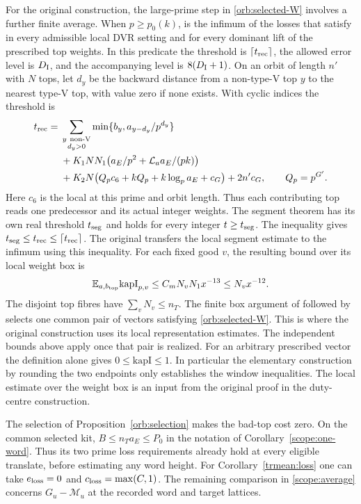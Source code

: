 For the original construction, the large-prime step in
\eqref{orb:selected-W} involves a further finite average.
When \(p\ge p_0(k)\),  is the infimum of the losses
that satisfy  in every admissible local DVR setting
and for every dominant lift of the prescribed top weights. In
this predicate the threshold is \(\lceil t_{\rm rec}\rceil\), the
allowed error level is \(D_{\rm I}\), and the accompanying level
is \(8(D_{\rm I}+1)\). On an orbit of length \(n'\) with \(N\) tops,
let \(d_y\) be the backward distance from a non-type-V top \(y\)
to the nearest type-V top, with value zero if none exists.
With cyclic indices the threshold  is
\[
\begin{aligned}
 t_{\rm rec}={}&
   \sum_{\substack{y\ {\rm non\text{-}V}\\ d_y>0}}
        \min\{b_y,a_{y-d_y}/p^{d_y}\}\\
 &+K_1NN_1\bigl(a_E/p^2+\mathcal L_a a_E/(pk)\bigr)\\
 &+K_2N\bigl(Q_pc_6+kQ_p+k\log_p a_E+c_G\bigr)+2n'c_G ,
 \qquad Q_p=p^{G'} .
\end{aligned}
\]
Here \(c_6\) is the local  at this prime and orbit length.
Thus each contributing top reads one predecessor and its actual
integer weights. The segment theorem has its own real threshold
\(t_{\rm seg}\) and holds for every integer \(t\ge t_{\rm seg}\).
The inequality  gives
\(t_{\rm seg}\le t_{\rm rec}\le\lceil t_{\rm rec}\rceil\).
The original
 transfers the local
segment estimate to the infimum using this inequality.
For each fixed good \(v\), the resulting bound over its local
weight box is
\[
 \mathbb E_{a,b_{\rm top}}\mathrm{kapI}_{p,v}
      \le C_m N_v N_1 x^{-13}\le N_v x^{-12}.
\]
The disjoint top fibres have \(\sum_vN_v\le n_T\).
The finite box argument of  followed by
 selects one common pair
of vectors satisfying \eqref{orb:selected-W}. This is where the
original construction uses its local representation estimates.
The independent bounds above apply once that pair is realized.
For an arbitrary prescribed vector the definition alone gives
\(0\le\mathrm{kapI}\le1\).
In particular the elementary construction by rounding the two
endpoints only establishes the window inequalities. The local
 estimate over the weight box is an input from the
original proof in the duty-centre construction.

The selection of Proposition~\ref{orb:selection} makes the bad-top
cost zero. On the common selected kit, \(B\le n_T a_E\le P_0\) in
the notation of Corollary~\ref{scope:one-word}. Thus its two prime
loss requirements already hold at every eligible translate, before
estimating any word height. For
Corollary~\ref{trmean:loss} one can take \(e_{\rm loss}=0\) and
\(c_{\rm loss}=\max(C,1)\). The remaining comparison in
\eqref{scope:average} concerns \(G_u-\mathcal M_u\) at the
recorded word and target lattices.

